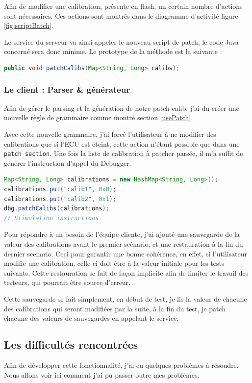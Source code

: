 	Afin de modifier une calibration, présente en flash, un certain nombre d'actions sont nécessaires. Ces actions sont montrés dans le diagramme d'activité figure \ref{fig:scriptBatch}.
	
	Le service du serveur va ainsi appeler le nouveau script de patch, le code Java concerné sera donc minime. Le prototype de la méthode est la suivante : 
	\begin{lstlisting}[language=Java, numbers=none]
public void patchCalibs(Map<String, Long> calibs);
	\end{lstlisting}

	\subsubsection{Le client : Parser \& générateur}
	Afin de gérer le parsing et la génération de notre patch calib, j'ai du créer une nouvelle règle de grammaire comme montré section \ref{usePatch}. 
	
	Avec cette nouvelle grammaire, j'ai forcé l'utilisateur à ne modifier des calibrations que si l'ECU est éteint, cette action n'étant possible que dans une \texttt{patch section}. Une fois la liste de calibration à patcher parsée, il m'a suffit de générer l'instruction d'appel du Debugger.
	
	\begin{lstlisting}[language=Java]
Map<String, Long> calibrations = new HashMap<String, Long>();
calibrations.put("calib1", 0x0);
calibrations.put("calib2", 0x1);
dbg.patchCalibs(calibrations);
// Stimulation instructions
	\end{lstlisting}
	
	Pour répondre à un besoin de l'équipe cliente, j'ai ajouté une sauvegarde de la valeur des calibrations avant le premier scénario, et une restauration à la fin du dernier scenario. Ceci pour garantir une bonne cohérence, en effet, si l'utilisateur modifie une calibration, celle-ci doit être à la valeur initiale pour les tests suivants. Cette restauration se fait de façon implicite afin de limiter le travail des testeurs, qui pourrait être source d'erreur.
	
	Cette sauvegarde se fait simplement, en début de test, je lis la valeur de chacune des calibrations qui seront modifiées par la suite, à la fin du test, je patch chacune des valeurs de sauvegardes en appelant le service.
	
	\subsection{Les difficultés rencontrées}
	Afin de développer cette fonctionnalité, j'ai eu quelques problèmes à résoudre. Nous allons voir ici comment j'ai pu passer outre mes problèmes. 

